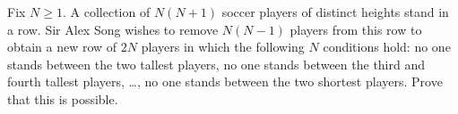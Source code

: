 Fix $N \ge 1$. A collection of $N(N+1)$ soccer players of distinct
heights stand in a row.
Sir Alex Song wishes to remove $N(N-1)$ players from this row
to obtain a new row of $2N$ players in which the following $N$
conditions hold: no one stands between the two tallest players,
no one stands between the third and fourth tallest players, \dots,
no one stands between the two shortest players.
Prove that this is possible.